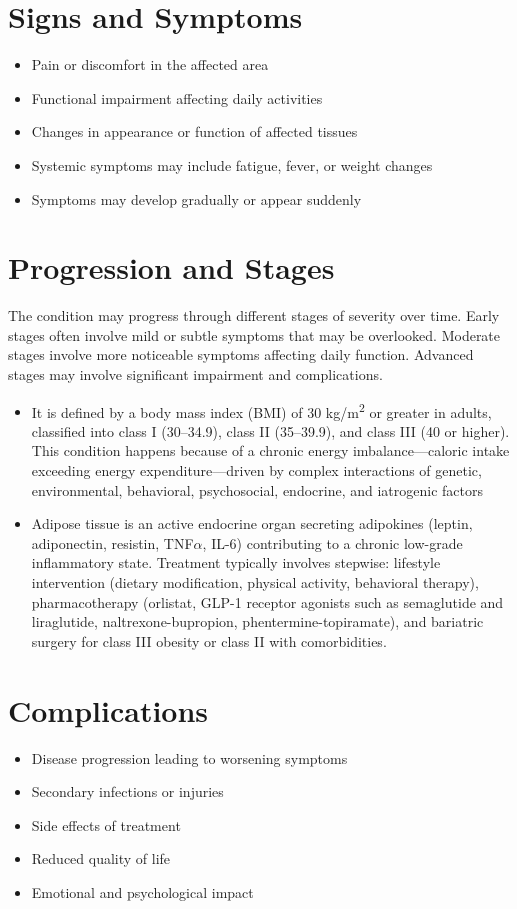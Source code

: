 \section{Signs and Symptoms}
\begin{itemize}[noitemsep]
  \item Pain or discomfort in the affected area
  \item Functional impairment affecting daily activities
  \item Changes in appearance or function of affected tissues
  \item Systemic symptoms may include fatigue, fever, or weight changes
  \item Symptoms may develop gradually or appear suddenly
\end{itemize}
\section{Progression and Stages}
The condition may progress through different stages of severity over time. Early stages often involve mild or subtle symptoms that may be overlooked. Moderate stages involve more noticeable symptoms affecting daily function. Advanced stages may involve significant impairment and complications.

\begin{itemize}[noitemsep]
  \item It is defined by a body mass index (BMI) of 30 kg/m\textsuperscript{2} or greater in adults, classified into class I (30--34.9), class II (35--39.9), and class III (40 or higher). This condition happens because of a chronic energy imbalance---caloric intake exceeding energy expenditure---driven by complex interactions of genetic, environmental, behavioral, psychosocial, endocrine, and iatrogenic factors
  \item Adipose tissue is an active endocrine organ secreting adipokines (leptin, adiponectin, resistin, TNF$\alpha$, IL-6) contributing to a chronic low-grade inflammatory state. Treatment typically involves stepwise: lifestyle intervention (dietary modification, physical activity, behavioral therapy), pharmacotherapy (orlistat, GLP-1 receptor agonists such as semaglutide and liraglutide, naltrexone-bupropion, phentermine-topiramate), and bariatric surgery for class III obesity or class II with comorbidities.
\end{itemize}
\section{Complications}
\begin{itemize}[noitemsep]
  \item Disease progression leading to worsening symptoms
  \item Secondary infections or injuries
  \item Side effects of treatment
  \item Reduced quality of life
  \item Emotional and psychological impact
\end{itemize}
